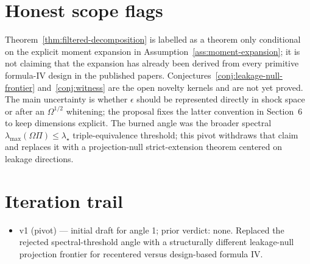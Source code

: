 \documentclass[11pt]{article}
\theoremstyle{definition}
\theoremstyle{plain}
\theoremstyle{remark}
\begin{document}
\section{Honest scope flags}
Theorem~\ref{thm:filtered-decomposition} is labelled as a theorem only conditional on the explicit moment expansion in Assumption~\ref{ass:moment-expansion}; it is not claiming that the expansion has already been derived from every primitive formula-IV design in the published papers.  Conjectures~\ref{conj:leakage-null-frontier} and~\ref{conj:witness} are the open novelty kernels and are not yet proved.  The main uncertainty is whether \(\epsilon\) should be represented directly in shock space or after an \(\Omega^{1/2}\) whitening; the proposal fixes the latter convention in Section~6 to keep dimensions explicit.  The burned angle was the broader spectral \(\lambda_{\max}(\Omega\Pi)\le\lambda_\star\) triple-equivalence threshold; this pivot withdraws that claim and replaces it with a projection-null strict-extension theorem centered on leakage directions.

\section{Iteration trail}
\begin{itemize}[leftmargin=*]
\item v1 (pivot) --- initial draft for angle 1; prior verdict: none.  Replaced the rejected spectral-threshold angle with a structurally different leakage-null projection frontier for recentered versus design-based formula IV.
\end{itemize}
\end{document}
